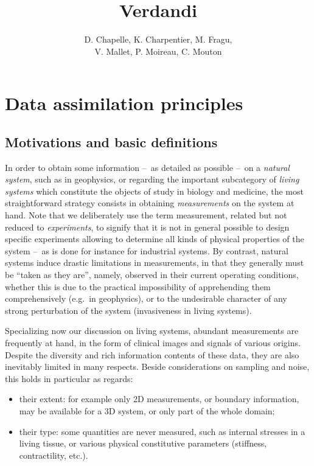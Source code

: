 \documentclass{tufte-book}
\title{Verdandi}
\author[D. Chapelle, K. Charpentier, M. Fragu, V. Mallet, P. Moireau]{D. Chapelle, K. Charpentier, M. Fragu,\\ V. Mallet, P. Moireau,  C. Mouton}
\begin{document}
\maketitle

\tableofcontents

\chapter{Data assimilation principles}

\section{Motivations and basic definitions}

In order to obtain some information --~as detailed as possible --~on a \emph{natural system}, such as in geophysics, or regarding the important subcategory of \emph{living systems} which constitute the objects of study in biology and medicine, the most straightforward strategy consists in obtaining \emph{measurements} on the system at hand. Note that we deliberately use the term measurement, related but not reduced to \emph{experiments}, to signify that it is not in general possible to design specific experiments allowing to determine all kinds of physical properties of the system --~as is done for instance for industrial systems. By contrast, natural systems induce drastic limitations in measurements, in that they generally must be ``taken as they are'', namely, observed in their current operating conditions, whether this is due to the practical impossibility of apprehending them comprehensively (e.g.~in geophysics), or to the undesirable character of any strong perturbation of the system (invasiveness in living systems).

Specializing now our discussion on living systems, abundant measurements are frequently at hand, in the form of clinical images and signals of various origins. Despite the diversity and rich information contents of these data, they are also inevitably limited in many respects. Beside considerations on sampling and noise, this holds in particular as regards:
\begin{itemize}
	\item their extent: for example only 2D measurements, or boundary information, may be available for a 3D system, or only part of the whole domain;
	\item their type: some quantities are never measured, such as internal stresses in a living tissue, or various physical constitutive parameters (stiffness, contractility, etc.).
\end{itemize}
\end{document}
